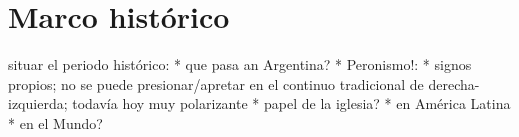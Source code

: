 \section{Marco histórico}

situar el periodo histórico:
* que pasa an Argentina?
  * Peronismo!:
    * signos propios; no se puede presionar/apretar en el continuo tradicional de derecha-izquierda; todavía hoy muy polarizante
    * papel de la iglesia?
* en América Latina
* en el Mundo?
